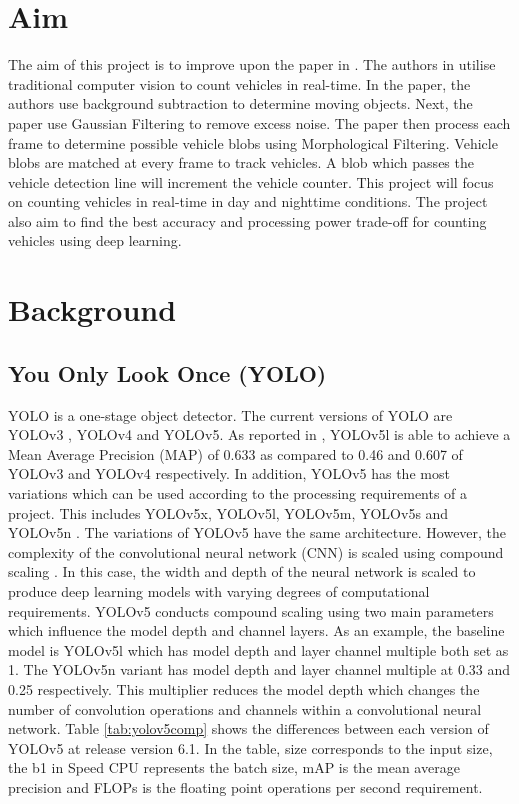 \documentclass[12pt,a4paper,fleqn]{report}
\begin{document}
\section{Aim}
The aim of this project is to improve upon the paper in \cite{rcvavc:2019}.
The authors in \cite{rcvavc:2019} utilise traditional computer vision to count vehicles in real-time.
In the paper, the authors use background subtraction to determine moving objects.
Next, the paper use Gaussian Filtering to remove excess noise.
The paper then process each frame to determine possible vehicle blobs using Morphological
Filtering.
Vehicle blobs are matched at every frame to track vehicles.
A blob which passes the vehicle detection line will increment the vehicle counter.
This project will focus on counting vehicles in real-time in day and nighttime
conditions.
The project also aim to find the best accuracy and processing power trade-off for counting
vehicles using deep learning.


\section{Background}

\subsection{You Only Look Once (YOLO)}
YOLO is a one-stage object detector.
The current versions of YOLO are YOLOv3 \cite{yolov3:2018}, YOLOv4 \cite{yolov4:2020} and YOLOv5.
As reported in \cite{compareyolo345:2022}, YOLOv5l is able to achieve a Mean Average Precision (MAP) of 0.633 as compared to 0.46 and 0.607 of YOLOv3 and YOLOv4 respectively.
In addition, YOLOv5 has the most variations which can be used according to the processing requirements of a
project.
This includes YOLOv5x, YOLOv5l, YOLOv5m, YOLOv5s and YOLOv5n \cite{yolov5git:2022}.
The variations of YOLOv5 have the same architecture.
However, the complexity of the convolutional neural network (CNN) is scaled using compound scaling
\cite{efficentdet:2019,efficientnet:2019}.
In this case, the width and depth of the neural network is scaled to produce deep learning models
with varying degrees of computational requirements.
YOLOv5 conducts compound scaling using two main parameters which influence the model depth and
channel layers.
As an example, the baseline model is YOLOv5l which has model depth and layer channel multiple both set as
1.
The YOLOv5n variant has model depth and layer channel multiple at 0.33 and 0.25 respectively.
This multiplier reduces the model depth which changes the number of convolution operations and
channels within a convolutional neural network.
Table \ref{tab:yolov5comp} shows the differences between each version of YOLOv5 at release version 6.1.
In the table, size corresponds to the input size, the b1 in Speed CPU represents the batch size, mAP is the mean average precision and FLOPs is the
floating point operations per second requirement.
\end{document}
